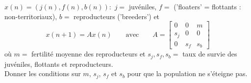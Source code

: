\begin{exercise*}
  $x(n) = (j(n), f(n), b(n)) :$ $j =$ juvéniles, $f = $ ('floaters' = flottants : non-territoriaux), $b = $ reproducteurs ('breeders') et
  $$
  x(n+1) = A x(n) 
  \qquad \text{avec} \qquad
  A = \left[\begin{array}{ccc} 0 & 0 & m \\ s_j & 0 & 0 \\ 0 & s_f & s_b \end{array}\right]
  $$
  où $m =$ fertilité moyenne des reproducteurs et $s_j, s_f, s_b =$ taux de survie des juvéniles, flottants et reproducteurs. \\
  Donner les conditions sur $m$, $s_j$, $s_f$ et $s_b$ pour que la population ne s'éteigne pas.
\end{exercise*}

